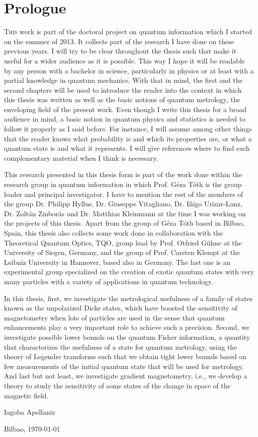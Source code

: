 \section*{Prologue}
\setcounter{page}{1}
\fancyfoot[LE,RO]{\thepage}

\lettrine[lines=2, findent=3pt,nindent=0pt]{T}{his} work is part of the doctoral project on quantum information which I started on the summer of 2013.
It collects part of the research I have done on these previous years.
I will try to be clear throughout the thesis such that make it useful for a wider audience as it is possible.
This way I hope it will be readable by any person with a bachelor in science, particularly in physics or at least with a partial knowledge in quantum mechanics.
With that in mind, the first and the second chapters will be used to introduce the reader into the context in which this thesis was written as well as the basic notions of quantum metrology, the enveloping field of the present work.
Even though I write this thesis for a broad audience in mind, a basic notion in quantum physics and statistics is needed to follow it properly as I said before.
For instance, I will assume among other things that the reader knows what probability is and which its properties are, or what a quantum state is and what it represents.
I will give references where to find such complementary material when I think is necessary.

This research presented in this thesis form is part of the work done within the research group in quantum information in which Prof.
G\'eza T\'oth is the group leader and principal investigator.
I have to mention the rest of the members of the group Dr. Philipp Hyllus, Dr. Giuseppe Vitagliano, Dr. I\~nigo Urizar-Lanz, Dr. Zolt\'an Zinbor\'as and Dr. Matthias Kleinmann at the time I was working on the projects of this thesis.
Apart from the group of G\'eza T\'oth based in Bilbao, Spain, this thesis also collects some work done in collaboration with the Theoretical Quantum Optics, TQO, group lead by Prof. Otfried G\"uhne at the University of Siegen, Germany, and the group of Prof. Carsten Klempt at the Leibniz University in Hannover, based also in Germany.
The last one is an experimental group specialized on the creation of exotic quantum states with very many particles with a variety of applications in quantum technology.

In this thesis, first, we investigate the metrological usefulness of a family of states known as the unpolarized Dicke states, which have boosted the sensitivity of magnetometry when lots of particles are used in the sense that quantum enhancements play a very important role to achieve such a precision.
Second, we investigate possible lower bounds on the quantum Fisher information, a quantity that characterizes the usefulness of a state for quantum metrology, using the theory of Legendre transforms such that we obtain tight lower bounds based on few measurements of the initial quantum state that will be used for metrology.
And last but not least, we investigate gradient magnetometry, i.e., we develop a theory to study the sensitivity of some states of the change in space of the magnetic field.

\begin{flushright}
  Iagoba Apellaniz

  Bilbao, \today
\end{flushright}
